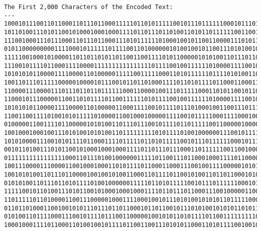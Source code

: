 \documentclass[11pt]{article}
\begin{document}
    \begin{Verbatim}[commandchars=\\\{\}]
The First 2,000 Characters of the Encoded Text:
---
10001011100110110001101110110001111101101011111001011101111110001011101010111100
10110100111010110010100010001000111101101110110100110101101111110011001000001100
11100100011101110001101110110001110101111110100010010110011000011101011001011110
01011000000000111100010111111011110011010000001010010010110011101010010100110101
11111001000101000011011011010110110011001111010110000010101001101110110110101101
11100101111011000111100001111111111111111011110010011111101000011110010011011111
10101010110000111100001101000001111100111110001101011111101111010100110111001010
10011011101111100000100001011100101101101000111101101011110110001100011011001011
11000011100001110111011011011111100011000010011101111100011010110010110101111110
11000101110000011001101011110110011111101011110010011111101000011110010011011111
10101010110000111100001101000001100011110010111101110100010011001110111101101011
11001100111101001010111110100001100100010000011110010111110001111000100100011011
01000001100111101100000101010011011101110010111101101111100110000010000001010111
10010001000100111010100101010011011111111101011110100100000011100101111011111010
10101000011100101011110110001111011111011010111110010111011111100010111010101111
00101101001110101100101000100010001111011011101110001101111110011001000001100111
01111111111111111000110111010010000001111101100111011000100011110110000111011001
10011100001110000110010001000110101111011000110001110010011110000010101101011110
10010101001101110110000100100101001100011011110110010100110110110001010000011010
01010100110111011010111101001000000111110110101111100101110111111000101110101111
11111001011010011101011001010001000100011110110111011000111001000001100011101110
11011111011010000110011100000100011110001001011101010010101011011111000100011001
01101101000110010010101110111011011000101101100101110101001010101101011111101111
01010011011110001110010111101110011000001001010110101111011001111111110110011101
10001000111101100011010010010111101100110011101010110001101011110010010101011001
    \end{Verbatim}
\end{document}
